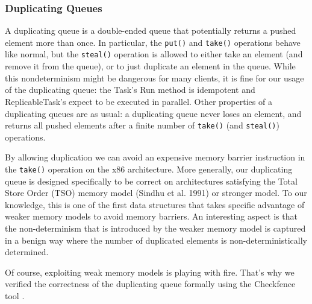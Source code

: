 \subsubsection{Duplicating Queues}

A duplicating queue is a double-ended queue that potentially returns a
pushed element more than once. In particular, the \lstinline!put()!
and \lstinline!take()! operations behave like normal, but the
\lstinline!steal()! operation is allowed to either take an element
(and remove it from the queue), or to just duplicate an element in the
queue. While this nondeterminism might be dangerous for many clients,
it is fine for our usage of the duplicating queue: the Task's Run
method is idempotent and ReplicableTask's expect to be executed in
parallel. Other properties of a duplicating queues are as usual: a
duplicating queue never loses an element, and returns all pushed
elements after a finite number of \lstinline!take()! (and
\lstinline!steal()!) operations.

By allowing duplication we can avoid an expensive memory barrier
instruction in the \lstinline!take()! operation on the x86
architecture. More generally, our duplicating queue is designed
specifically to be correct on architectures satisfying the Total Store
Order (TSO) memory model (Sindhu et al. 1991) or stronger model. To
our knowledge, this is one of the first data structures that takes
specific advantage of weaker memory models to avoid memory
barriers. An interesting aspect is that the non-determinism that is
introduced by the weaker memory model is captured in a benign way
where the number of duplicated elements is non-deterministically
determined.

Of course, exploiting weak memory models is playing with fire. That's
why we verified the correctness of the duplicating queue formally
using the Checkfence tool \cite{Burckhardt2007, Burckhardt2007a}.


